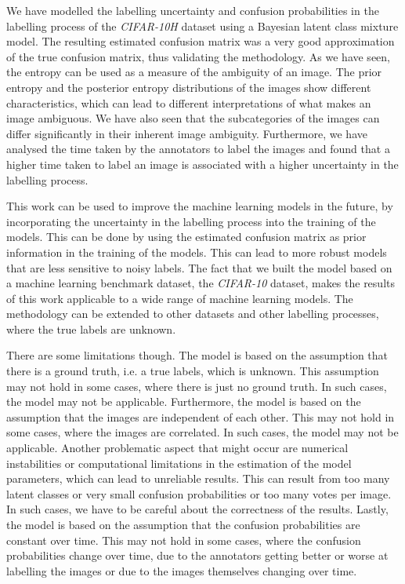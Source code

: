 
We have modelled the labelling uncertainty and confusion probabilities in the
labelling process of the \textit{CIFAR-10H} dataset using a Bayesian latent
class mixture model. The resulting estimated confusion matrix was a very good
approximation of the true confusion matrix, thus validating the methodology. As
we have seen, the entropy can be used as a measure of the ambiguity of an image.
The prior entropy and the posterior entropy distributions of the images show
different characteristics, which can lead to different interpretations of what
makes an image ambiguous. We have also seen that the subcategories of the images
can differ significantly in their inherent image ambiguity. Furthermore, we have
analysed the time taken by the annotators to label the images and found that
a higher time taken to label an image is associated with a higher uncertainty in
the labelling process.\bigskip

This work can be used to improve the machine learning models in the future, by
incorporating the uncertainty in the labelling process into the training of the
models. This can be done by using the estimated confusion matrix as prior
information in the training of the models. This can lead to more robust models
that are less sensitive to noisy labels. The fact that we built the model based
on a machine learning benchmark dataset, the \textit{CIFAR-10} dataset, makes
the results of this work applicable to a wide range of machine learning models.
The methodology can be extended to other datasets and other labelling processes,
where the true labels are unknown.\bigskip

There are some limitations though. The model is based on the assumption that
there is a ground truth, i.e. a true labels, which is unknown. This assumption
may not hold in some cases, where there is just no ground truth. In such cases,
the model may not be applicable. Furthermore, the model is based on the
assumption that the images are independent of each other. This may not hold in
some cases, where the images are correlated. In such cases, the model may not be
applicable. Another problematic aspect that might occur are numerical
instabilities or computational limitations in the estimation of the model
parameters, which can lead to unreliable results. This can result from too many
latent classes or very small confusion probabilities or too many votes per
image. In such cases, we have to be careful about the correctness of the
results. Lastly, the model is based on the assumption that the confusion
probabilities are constant over time. This may not hold in some cases, where the
confusion probabilities change over time, due to the annotators getting better
or worse at labelling the images or due to the images themselves changing over
time.\bigskip

